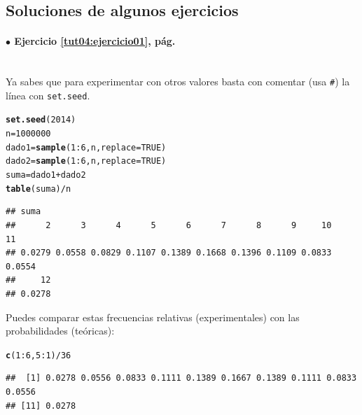 \documentclass[10pt,a4paper]{article}\usepackage[]{graphicx}\usepackage[]{color}
\makeatletter
\newcommand{\hlnum}[1]{\textcolor[rgb]{0.686,0.059,0.569}{#1}}%
\newcommand{\hlopt}[1]{\textcolor[rgb]{0,0,0}{#1}}%
\newcommand{\hlstd}[1]{\textcolor[rgb]{0.345,0.345,0.345}{#1}}%
\newcommand{\hlkwb}[1]{\textcolor[rgb]{0.69,0.353,0.396}{#1}}%
\newcommand{\hlkwc}[1]{\textcolor[rgb]{0.333,0.667,0.333}{#1}}%
\newcommand{\hlkwd}[1]{\textcolor[rgb]{0.737,0.353,0.396}{\textbf{#1}}}%
\newenvironment{kframe}{%
 \def\at@end@of@kframe{}%
 \ifinner\ifhmode%
  \def\at@end@of@kframe{\end{minipage}}%
  \begin{minipage}{\columnwidth}%
 \fi\fi%
 \def\FrameCommand##1{\hskip\@totalleftmargin \hskip-\fboxsep
 \colorbox{shadecolor}{##1}\hskip-\fboxsep
     \hskip-\linewidth \hskip-\@totalleftmargin \hskip\columnwidth}%
 \MakeFramed {\advance\hsize-\width
   \@totalleftmargin\z@ \linewidth\hsize
   \@setminipage}}%
 {\par\unskip\endMakeFramed%
 \at@end@of@kframe}
\newenvironment{knitrout}{}{} %
\makeatother
\begin{document}
\subsection*{Soluciones de algunos ejercicios}


\paragraph{\bf $\bullet$ Ejercicio \ref{tut04:ejercicio01}, pág. \pageref{tut04:ejercicio01}}
\label{tut04:ejercicio01:sol}\quad\\

Ya sabes que para experimentar con otros valores basta con comentar (usa \verb/#/) la línea con {\tt set.seed}.
\begin{knitrout}
\color{fgcolor}\begin{kframe}
\begin{alltt}
\hlkwd{set.seed}\hlstd{(}\hlnum{2014}\hlstd{)}
\hlstd{n} \hlkwb{=} \hlnum{1000000}
\hlstd{dado1} \hlkwb{=} \hlkwd{sample}\hlstd{(}\hlnum{1}\hlopt{:}\hlnum{6}\hlstd{, n,} \hlkwc{replace}\hlstd{=}\hlnum{TRUE}\hlstd{)}
\hlstd{dado2} \hlkwb{=} \hlkwd{sample}\hlstd{(}\hlnum{1}\hlopt{:}\hlnum{6}\hlstd{, n,} \hlkwc{replace}\hlstd{=}\hlnum{TRUE}\hlstd{)}
\hlstd{suma} \hlkwb{=} \hlstd{dado1} \hlopt{+} \hlstd{dado2}
\hlkwd{table}\hlstd{(suma)}\hlopt{/}\hlstd{n}
\end{alltt}
\begin{verbatim}
## suma
##      2      3      4      5      6      7      8      9     10     11 
## 0.0279 0.0558 0.0829 0.1107 0.1389 0.1668 0.1396 0.1109 0.0833 0.0554 
##     12 
## 0.0278
\end{verbatim}
\end{kframe}
\end{knitrout}
Puedes comparar estas frecuencias relativas (experimentales) con las probabilidades (teóricas):
\begin{knitrout}
\color{fgcolor}\begin{kframe}
\begin{alltt}
\hlkwd{c}\hlstd{(}\hlnum{1}\hlopt{:}\hlnum{6}\hlstd{,}\hlnum{5}\hlopt{:}\hlnum{1}\hlstd{)}\hlopt{/}\hlnum{36}
\end{alltt}
\begin{verbatim}
##  [1] 0.0278 0.0556 0.0833 0.1111 0.1389 0.1667 0.1389 0.1111 0.0833 0.0556
## [11] 0.0278
\end{verbatim}
\end{kframe}
\end{knitrout}
\end{document}
